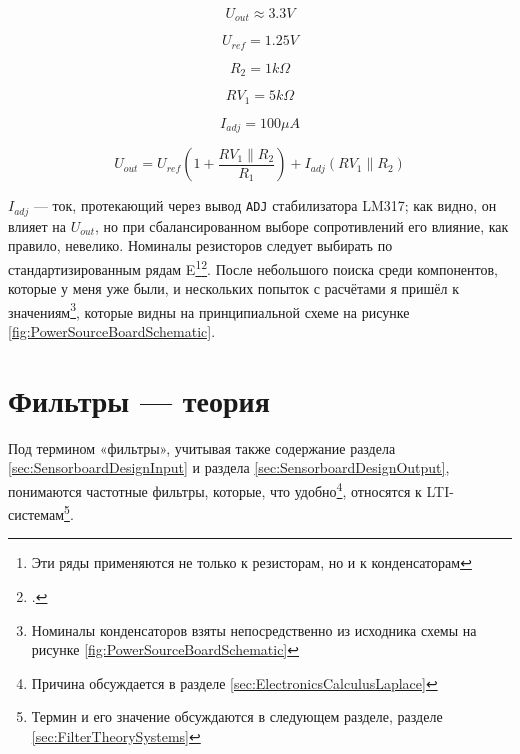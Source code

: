 \documentclass[a4paper, 10pt, final]{article} %
\begin{document}
    \begin{figure}[H]
        \centering
        \begin{minipage}[H]{.15\linewidth}
            \[U_{out} \approx 3.3V\]
        \end{minipage}
        \begin{minipage}[H]{.15\linewidth}
            \[U_{ref}=1.25V\]
        \end{minipage}
        \begin{minipage}[H]{.15\linewidth}
            \[R_2=1k\Omega\]
        \end{minipage}
        \begin{minipage}[H]{.15\linewidth}
            \[RV_1=5k\Omega\]
        \end{minipage}
        \begin{minipage}[H]{.15\linewidth}
            \[I_{adj}=100\mu A\]
        \end{minipage}
        \begin{minipage}[H]{\linewidth}
            \vspace{3ex}
            \[U_{out}=U_{ref}\left(1+\frac{RV_1 \parallel R_2}{R_1}\right)+I_{adj} \left(RV_1 \parallel R_2\right)\]
        \end{minipage}
    \end{figure} 
    \noindent $I_{adj}$ --- ток, протекающий через вывод \texttt{ADJ} стабилизатора LM317; как видно, он влияет на $U_{out}$, но при сбалансированном выборе сопротивлений его влияние, как правило, невелико.
    Номиналы резисторов следует выбирать по стандартизированным рядам E\footnote{Эти ряды применяются не только к резисторам, но и к конденсаторам}\:\footcite[]{ESeries:Wiki}.
    После небольшого поиска среди компонентов, которые у меня уже были, и нескольких попыток с расчётами я пришёл к значениям\footnote{Номиналы конденсаторов взяты непосредственно из исходника схемы на рисунке \ref{fig:PowerSourceBoardSchematic}}, которые видны на принципиальной схеме на рисунке \ref{fig:PowerSourceBoardSchematic}.
    \clearpage

    \section{Фильтры --- теория}\label{sec:FilterTheory}
    Под термином «фильтры», учитывая также содержание раздела \ref{sec:SensorboardDesignInput} и раздела \ref{sec:SensorboardDesignOutput}, понимаются частотные фильтры, которые, что удобно\footnote{Причина обсуждается в разделе \ref{sec:ElectronicsCalculusLaplace}}, относятся к LTI-системам\footnote{Термин и его значение обсуждаются в следующем разделе, разделе \ref{sec:FilterTheorySystems}}.
\end{document}
